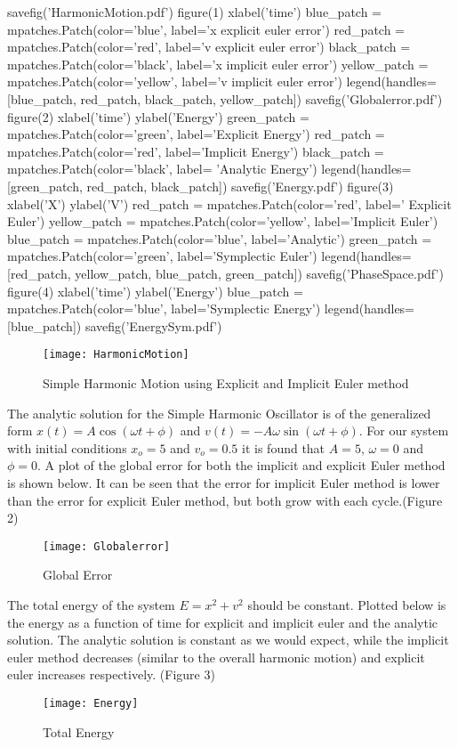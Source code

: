 \documentclass{article}
\begin{document}
\begin{pylabcode}[firstsession]
savefig('HarmonicMotion.pdf')
figure(1)
xlabel('time')
blue_patch = mpatches.Patch(color='blue', label='x explicit euler error')
red_patch = mpatches.Patch(color='red', label='v explicit euler error')
black_patch = mpatches.Patch(color='black', label='x implicit euler error')
yellow_patch = mpatches.Patch(color='yellow', label='v implicit euler error')
legend(handles=[blue_patch, red_patch, black_patch, yellow_patch])
savefig('Globalerror.pdf')
figure(2)
xlabel('time')
ylabel('Energy')
green_patch = mpatches.Patch(color='green', label='Explicit Energy')
red_patch = mpatches.Patch(color='red', label='Implicit Energy')
black_patch = mpatches.Patch(color='black', label= 'Analytic Energy')
legend(handles= [green_patch, red_patch, black_patch])
savefig('Energy.pdf')
figure(3)
xlabel('X')
ylabel('V')
red_patch = mpatches.Patch(color='red', label=' Explicit Euler')
yellow_patch = mpatches.Patch(color='yellow', label='Implicit Euler')
blue_patch = mpatches.Patch(color='blue', label='Analytic')
green_patch = mpatches.Patch(color='green', label='Symplectic Euler')
legend(handles=[red_patch, yellow_patch, blue_patch, green_patch])
savefig('PhaseSpace.pdf')
figure(4)
xlabel('time')
ylabel('Energy')
blue_patch = mpatches.Patch(color='blue', label='Symplectic Energy')
legend(handles= [blue_patch])
savefig('EnergySym.pdf')

\end{pylabcode}

\begin{figure}[h]
\texttt{[image: HarmonicMotion]}
\caption{Simple Harmonic Motion using Explicit and Implicit Euler method}
\end{figure}

The analytic solution for the Simple Harmonic Oscillator is of the generalized form $ x(t) = A \cos( \omega t + \phi)$ and $ v(t) = -A \omega \sin( \omega t + \phi)$. For our system with initial conditions $x_o = 5$ and $v_o = 0.5$ it is found that  $A=5$, $\omega = 0$ and $ \phi = 0$. A plot of the global error for both the implicit and explicit Euler method is shown below. 
It can be seen that the error for implicit Euler method is lower than the error for explicit Euler method, but both grow with each cycle.(Figure 2)
\begin{figure}[h]
\texttt{[image: Globalerror]}
\caption{Global Error}
\end{figure}
The total energy of the system $E = x^2 + v^2$ should be constant. Plotted below is the energy as a function of time for explicit and implicit euler and the analytic solution. The analytic solution is constant as we would expect, while the implicit euler method decreases (similar to the overall harmonic motion) and explicit euler increases respectively. (Figure 3)
\begin{figure}[h]
\texttt{[image: Energy]}
\caption{Total Energy}
\end{figure}
\end{document}
